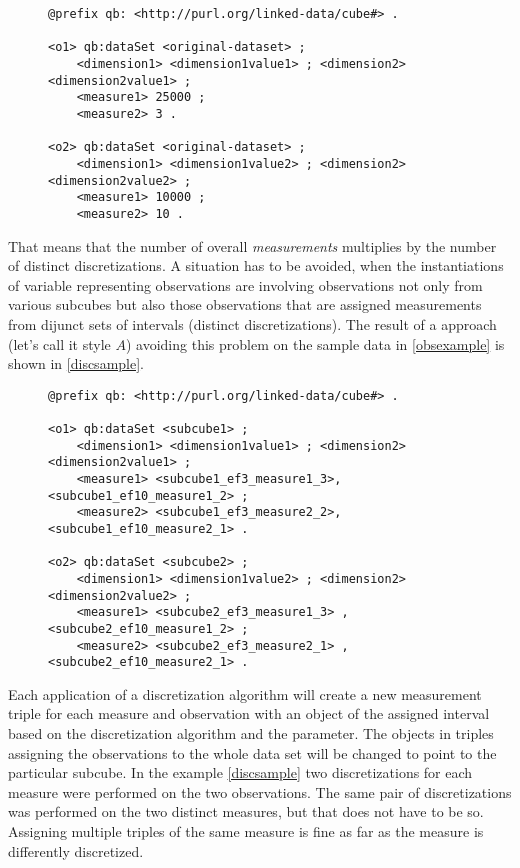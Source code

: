 \begin{figure}[h]
\begin{lstlisting}[language = turtle, caption={Observations example}, label={obsexample},captionpos=b escapeinside={(*@}{@*)}]
@prefix qb: <http://purl.org/linked-data/cube#> .

<o1> qb:dataSet <original-dataset> ;
    <dimension1> <dimension1value1> ; <dimension2> <dimension2value1> ;
    <measure1> 25000 ;
    <measure2> 3 .
    
<o2> qb:dataSet <original-dataset> ;
    <dimension1> <dimension1value2> ; <dimension2> <dimension2value2> ;
    <measure1> 10000 ;
    <measure2> 10 .
\end{lstlisting}
\end{figure}

That means that the number of overall \textit{measurements} multiplies by the number of distinct discretizations. A situation has to be avoided, when the instantiations of variable representing observations are involving observations not only from various subcubes but also those observations that are assigned measurements from dijunct sets of intervals (distinct discretizations). The result of a approach (let's call it style $A$) avoiding this problem on the sample data in \ref{obsexample} is shown in \ref{discsample}.

\begin{figure}[h]
\begin{lstlisting}[language = turtle, caption={Structure style A}, label={discsample},captionpos=b escapeinside={(*@}{@*)}]
@prefix qb: <http://purl.org/linked-data/cube#> .
            
<o1> qb:dataSet <subcube1> ;
    <dimension1> <dimension1value1> ; <dimension2> <dimension2value1> ;
    <measure1> <subcube1_ef3_measure1_3>, <subcube1_ef10_measure1_2> ;
    <measure2> <subcube1_ef3_measure2_2>, <subcube1_ef10_measure2_1> .
   
<o2> qb:dataSet <subcube2> ;
    <dimension1> <dimension1value2> ; <dimension2> <dimension2value2> ;
    <measure1> <subcube2_ef3_measure1_3> , <subcube2_ef10_measure1_2> ;
    <measure2> <subcube2_ef3_measure2_1> ,<subcube2_ef10_measure2_1> .
\end{lstlisting}
\end{figure}

Each application of a discretization algorithm will create a new measurement triple for each measure and observation with an object of the assigned interval based on the discretization algorithm and the parameter. The objects in triples assigning the observations to the whole data set will be changed to point to the particular subcube. In the example \ref{discsample} two discretizations for each measure were performed on the two observations. The same pair of discretizations was performed on the two distinct measures, but that does not have to be so. Assigning multiple triples of the same measure is fine as far as the measure is differently discretized.

